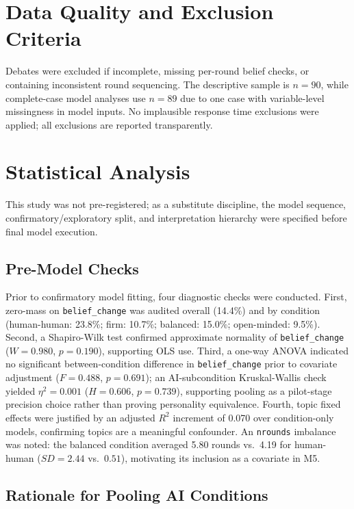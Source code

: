 \section{Data Quality and Exclusion Criteria}

Debates were excluded if incomplete, missing per-round belief checks, or
containing inconsistent round sequencing. The descriptive sample is $n = 90$,
while complete-case model analyses use $n = 89$ due to one case with
variable-level missingness in model inputs. No implausible
response time exclusions were applied; all exclusions are reported
transparently.

\pagebreak
\section{Statistical Analysis}

This study was not pre-registered; as a substitute discipline, the model sequence,
confirmatory/exploratory split, and interpretation hierarchy were specified before final model execution.

\subsection{Pre-Model Checks}

Prior to confirmatory model fitting, four diagnostic checks were
conducted.
First, zero-mass on \texttt{belief\_change} was audited
overall (14.4\%) and by condition (human-human: 23.8\%; firm: 10.7\%;
balanced: 15.0\%; open-minded: 9.5\%).
Second, a Shapiro-Wilk test
confirmed approximate normality of \texttt{belief\_change}
($W = 0.980$, $p = 0.190$), supporting OLS use.
Third, a one-way ANOVA indicated no significant between-condition
difference in \texttt{belief\_change} prior to covariate adjustment ($F = 0.488$,
$p = 0.691$); an AI-subcondition Kruskal-Wallis check yielded $\eta^2 = 0.001$
($H = 0.606$, $p = 0.739$), supporting pooling as a pilot-stage precision choice
rather than proving personality equivalence.
Fourth, topic fixed effects were justified by an adjusted
$R^2$ increment of 0.070 over condition-only models, confirming topics
are a meaningful confounder. An \texttt{nrounds} imbalance was noted:
the balanced condition averaged 5.80 rounds vs.\ 4.19 for human-human
($SD = 2.44$ vs.\ $0.51$), motivating its inclusion as a covariate in
M5.

\subsection{Rationale for Pooling AI Conditions}

